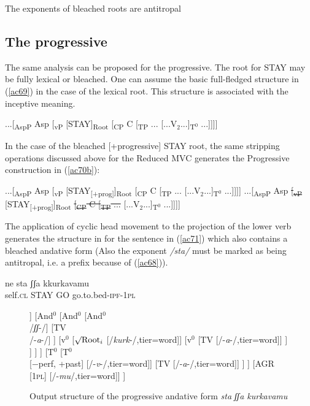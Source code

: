 \documentclass[output=paper]{langscibook}
\begin{document}
\ea\label{ac68}
The exponents of bleached roots are antitropal
\z

\subsection{The progressive}

The same analysis can be proposed for the progressive.  The root for STAY may be fully lexical or bleached. One can assume the basic full-fledged structure in (\ref{ac69}) in the case of the lexical root.  This structure is associated with the inceptive meaning.

\ea \label{ac69}...[\textsubscript{AspP} Asp [\textsubscript{vP} [STAY]\textsubscript{Root} [\textsubscript{CP} C [\textsubscript{TP} ... [...V$_2$...]\textsubscript{T$^0$} ...]]]]
\z

In the case of the bleached [+progressive] STAY root, the same stripping operations discussed above for the Reduced MVC generates the Progressive construction in (\ref{ac70b}):

\ea \label{ac70}
    \ea \label{ac70a}...[\textsubscript{AspP} Asp [\textsubscript{vP} [STAY\textsubscript{[+prog]}]\textsubscript{Root} [\textsubscript{CP} C [\textsubscript{TP} ... [...V$_2$...]\textsubscript{T$^0$} ...]]]]
    \ex \label{ac70b}...[\textsubscript{AspP} Asp \sout{[\textsubscript{vP}} [STAY\textsubscript{[+prog]}]\textsubscript{Root} \sout{[\textsubscript{CP} C [\textsubscript{TP} ...} [...V$_2$...]\textsubscript{T$^0$} ...]]]]
    \z
\z

The application of cyclic head movement to the projection of the lower verb generates the structure in  for the sentence in (\ref{ac71}) which also contains a bleached andative form (Also the exponent \textit{/sta/} must be marked as being antitropal, i.e. a prefix because of (\ref{ac68})).

\ea \label{ac71}
    \gll ne     sta    ʃʃa  kkurkavamu\\
   self.\textsc{cl} STAY GO  go.to.bed-\textsc{ipf}-\textsc{1pl}\\
\z

\begin{figure}
  \caption{\label{ac72}Output structure of the progressive andative form \textit{sta ʃʃa kurkavamu}}
  \begin{forest}
  	[T$^0$
  		[T$^0$
	  		[$\surd{} + \text{prog}$
	  			[$\surd{} + \text{prog}$
	  				[$\surd{} + \text{prog}$\\/\textit{st}-/]
	  				[TV\\/-\textit{a}-/]
	  			]
	  			[And$^0$
	  				[And$^0$
	  					[And$^0$\\/\textit{ʃʃ}-/]
	  					[TV\\/-\textit{a}-/]
	  				]
	  				[v$^0$
	  					[$\surd\text{Root}_i$ [/\textit{kurk}-/,tier=word]]
	  					[v$^0$
	  						[TV [/-\textit{a}-/,tier=word]]
	  					]
	  				]
	  			]
	  		]
	  		[T$^0$
	  			[T$^0$\\{[−perf, +past]} [/-\textit{v}-/,tier=word]]
	  			[TV [/-\textit{a}-/,tier=word]]
	  		]
  		]
  		[AGR\\\textsc{[1pl]} [/-\textit{mu}/,tier=word]]
  	]
  \end{forest}
\end{figure}
\end{document}
